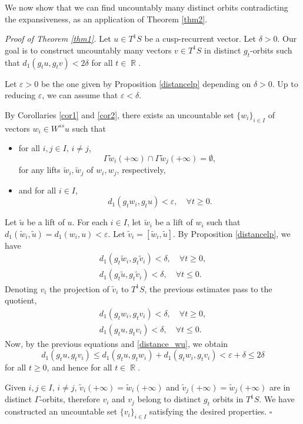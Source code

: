 \documentclass[a4paper,english,reqno]{amsart}
\DeclareMathOperator{\reals}{\mathbb{R}}
\newenvironment{myproof}[2] {\emph{Proof of {#1} {#2}.}}{\hfill$\square$}
\theoremstyle{definition}
\numberwithin{equation}{section}
\begin{document}
We now show that we can find uncountably many distinct orbits contradicting the expansiveness, as an application of Theorem \ref{thm2}.

\begin{myproof}{Theorem}{\ref{thm1}} %
	Let $u\in T^1 S$ be a cusp-recurrent vector. 
	Let $\delta>0$. Our goal is to construct uncountably many vectors $v\in T^1 S$ in distinct $g_t$-orbits such that $d_1(g_t u, g_t v)< 2 \delta$ for all $t \in \reals$.
	
	Let $\varepsilon>0$ be the one given by Proposition \ref{distancelp} depending on $\delta>0$. Up to reducing $\varepsilon$, we can assume that $\varepsilon< \delta$. 
	
	By Corollaries \ref{cor1} and \ref{cor2}, there exists an uncountable set $\{w_i\}_{i\in I}$ of vectors $w_i\in W^{ss}u$ such that
	\begin{itemize}
		\item for all $i,j\in I, \, i\not = j $,
		\[
		\Gamma \tilde w_i (+\infty ) \cap \Gamma \tilde w_j (+\infty ) = \emptyset,
		\]
		for any lifts $\tilde w_i, \tilde w_j$ of $w_i, w_j$, respectively,
		
		\item and for all $i\in I$,
		\begin{equation}\label{distance_wu}
			d_1(g_ t w_i, g_t u)<\varepsilon, \quad \forall t\ge 0.
		\end{equation}
		
	\end{itemize}
	 
	Let $\tilde u$ be a lift of $u$. For each $i\in I$, let $\tilde w_i $ be a lift of $w_i$ such that $d_1(\tilde w_i, \tilde u)= d_1(w_i,u) <\varepsilon$. Let $\tilde v_i = [\tilde w_i , \tilde u]$. By Proposition \ref{distancelp}, we have 
	\begin{align*}
		d_1(g_t \tilde w_i , g_t \tilde v_i ) <\delta, \quad \forall t\ge 0 ,\\
		d_1(g_t \tilde u , g_t \tilde v_i ) <\delta, \quad \forall t\le 0 . 
	\end{align*}
	Denoting $v_i$ the projection of $\tilde v_i$ to $T^1 S$, the previous estimates pass to the quotient,
	\begin{align*}
		d_1(g_t w_i , g_t v_i ) <\delta, \quad \forall t\ge 0 ,\\
		d_1(g_t u , g_t v_i ) <\delta, \quad \forall t\le 0 . 
	\end{align*}
	Now, by the previous equations and \ref{distance_wu}, we obtain
	\[
	d_1(g_t u , g_t v_i ) \le d_1(g_t u , g_t w_i ) + d_1(g_t w_i , g_t v_i ) < \varepsilon + \delta \le 2\delta
	\]
	for all $t\ge 0$, and hence for all $t\in \reals$.
	
	Given $i,j\in I, \, i\not =j$, $\tilde v_i(+\infty) =\tilde w_i(+\infty)$ and $\tilde v_j(+\infty) =\tilde w_j(+\infty)$ are in distinct $\Gamma$-orbits, therefore $v_i$ and $v_j$ belong to distinct $g_t$ orbits in $T^1 S$.
	We have constructed an uncountable set $\{v_i\}_{i\in I}$ satisfying the desired properties.
\end{myproof}
\end{document}
